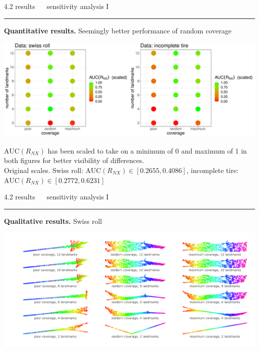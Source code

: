 \documentclass[11pt, compress, t, notes = noshow, xcolor = table, 
aspectratio = 1610]{beamer}
\begin{document}
\LARGE
\begin{frame}{\textcolor{gray!90}{4.2 results} ~~ sensitivity analysis I}
\normalsize
\vspace{-0.5cm}
\noindent \textcolor{gray!90}{\rule{\textwidth}{1pt}}
\smallskip

\textbf{Quantitative results.} Seemingly better performance of random coverage

\vspace{0.3cm}

\includegraphics[trim = 0 0 0 0, clip, %
    width = \textwidth]{figures/sensitivity_landmarks_auc}
    
\vspace{0.3cm}

\scriptsize
$\text{AUC}(R_{NX})$ has been scaled to take on a minimum of 0 and maximum of 1 
in both figures for better visibility of differences. \\
Original scales. Swiss roll: $\text{AUC}(R_{NX}) \in [0.2655, 0.4086]$, 
incomplete tire: $\text{AUC}(R_{NX}) \in [0.2772, 0.6231]$

\end{frame}


\LARGE
\begin{frame}{\textcolor{gray!90}{4.2 results} ~~ sensitivity analysis I}
\normalsize
\vspace{-0.5cm}
\noindent \textcolor{gray!90}{\rule{\textwidth}{1pt}}
\smallskip

\textbf{Qualitative results.} Swiss roll

\vspace{0.3cm}

\includegraphics[trim = 40 10 0 0, clip, %
    width = \textwidth]{figures/sensitivity_landmarks_qual_swiss}

\end{frame}
\end{document}
